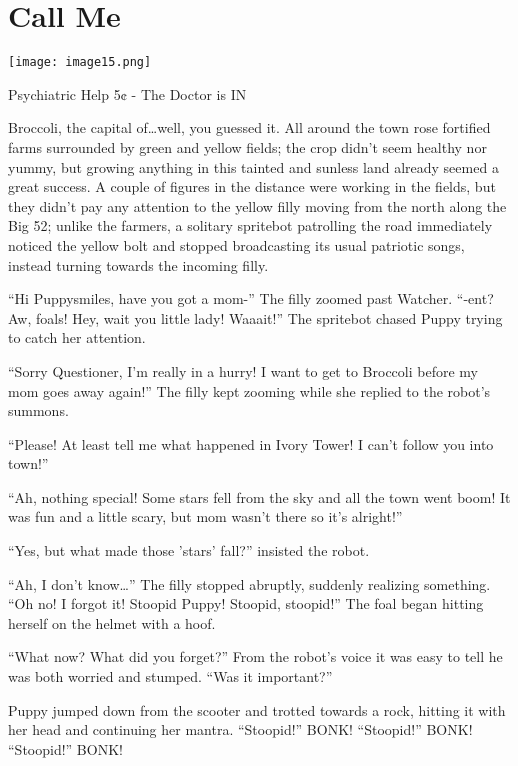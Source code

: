 \chapter{Call Me}

\texttt{[image: image15.png]}

\begin{intro}
    Psychiatric Help 5¢ - The Doctor is IN
\end{intro}


Broccoli, the capital of\dots well, you guessed it. All around the town rose fortified farms surrounded by green and yellow fields; the crop didn't seem healthy nor yummy, but growing anything in this tainted and sunless land already seemed a great success. A couple of figures in the distance were working in the fields, but they didn't pay any attention to the yellow filly moving from the north along the Big 52; unlike the farmers, a solitary spritebot patrolling the road immediately noticed the yellow bolt and stopped broadcasting its usual patriotic songs, instead turning towards the incoming filly.

``Hi Puppysmiles, have you got a mom-'' The filly zoomed past Watcher. ``-ent? Aw, foals! Hey, wait you little lady! Waaait!'' The spritebot chased Puppy trying to catch her attention.

``Sorry Questioner, I'm really in a hurry! I want to get to Broccoli before my mom goes away again!'' The filly kept zooming while she replied to the robot's summons.

``Please! At least tell me what happened in Ivory Tower! I can't follow you into town!''

``Ah, nothing special! Some stars fell from the sky and all the town went boom! It was fun and a little scary, but mom wasn't there so it's alright!''

``Yes, but what made those 'stars' fall?'' insisted the robot.

``Ah, I don't know\dots'' The filly stopped abruptly, suddenly realizing something. ``Oh no! I forgot it! Stoopid Puppy! Stoopid, stoopid!'' The foal began hitting herself on the helmet with a hoof.

``What now? What did you forget?'' From the robot's voice it was easy to tell he was both worried and stumped. ``Was it important?''

Puppy jumped down from the scooter and trotted towards a rock, hitting it with her head and continuing her mantra. ``Stoopid!'' BONK! ``Stoopid!'' BONK! ``Stoopid!'' BONK!

